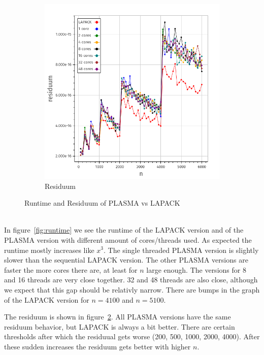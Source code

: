 \documentclass[a4paper,final,ngerman,english]{article}
\begin{document}
\begin{figure}[h!]
\begin{subfigure}{0.46\textwidth}
		\includegraphics[width=\textwidth]{res}
		\caption{Residuum}
\label{fig:residuum}
	\end{subfigure}
	\caption{Runtime and Residuum of PLASMA vs LAPACK}
\end{figure}

\ \\
In figure~\ref{fig:runtime}
we see the runtime of the LAPACK version and of the PLASMA version with different amount of cores/threads used.
As expected the runtime mostly increases like \(x^3\).
The single threaded PLASMA version is slightly slower than the sequential LAPACK version.
The other PLASMA versions are faster the more cores there are, at least for $n$ large enough.
The versions for 8 and 16 threads are very close together. 32 and 48 threads are also close, although
we expect that this gap should be relativly narrow.
There are bumps in the graph of the LAPACK version for \(n = 4100\) and \(n = 5100 \).

The residuum is shown in figure~\ref{fig:residuum}.
All PLASMA versions have the same residuum behavior, but LAPACK is always a bit better.  
There are certain thresholds after which the residuual gets worse (200, 500, 1000, 2000, 4000).
After these sudden increases the residuum gets better with higher $n$.
\end{document}
